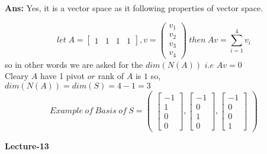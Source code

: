 \documentclass[a4paper,11pt]{article}
\numberwithin{equation}{section}
\begin{document}
\begin{itemize}
\textbf{Ans: }Yes, it is a vector space as it following properties of vector space.
\begin{center}
    \[let \hspace{3pt}
    A=\begin{bmatrix}
        1&1&1&1
    \end{bmatrix},
    v=\begin{pmatrix}
        v_1\\v_2\\v_3\\v_4
    \end{pmatrix} \hspace{3pt}then\hspace{3pt} Av=\sum_{i=1}^{4}v_i
    \]
    so in other words we are asked for the $dim(N(A))$ $i.e$ $Av=0$\\
Cleary $A$ have 1 pivot $or$ rank of $A$ is $1$ so,\\
\vspace{6pt}
 $dim(N(A))=dim(S)=4-1=3$
    \[ Example \hspace{3pt}of \hspace{3pt}Basis \hspace{3pt}of \hspace{3pt}S=
    \begin{pmatrix}
        \begin{bmatrix}
            -1\\1\\0\\0
        \end{bmatrix},
        \begin{bmatrix}
            -1\\0\\1\\0
        \end{bmatrix},
        \begin{bmatrix}
            -1\\0\\0\\1
        \end{bmatrix}
    \end{pmatrix}
    \]
\end{center}


\begin{center}
    \Huge{\textbf{Lecture-13}}
\end{center}
\vspace{5pt}


\end{itemize}
\end{document}
